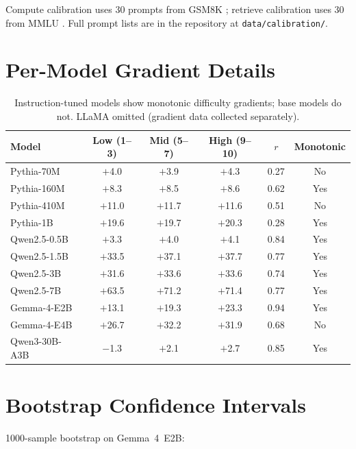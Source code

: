 \documentclass[11pt]{article}
\begin{document}
Compute calibration uses 30 prompts from GSM8K \citep{cobbe2021gsm8k}; retrieve calibration uses 30 from MMLU \citep{hendrycks2021mmlu}. Full prompt lists are in the repository at \texttt{data/calibration/}.

\section{Per-Model Gradient Details}\label{app:gradient}

\begin{table}[h]
\caption{Instruction-tuned models show monotonic difficulty gradients; base models do not. LLaMA omitted (gradient data collected separately).}
\vspace{4pt}
\centering
\small
\begin{tabular}{@{}lccccc@{}}
\toprule
Model & Low (1--3) & Mid (5--7) & High (9--10) & $r$ & Monotonic \\
\midrule
Pythia-70M & $+$4.0 & $+$3.9 & $+$4.3 & 0.27 & No \\
Pythia-160M & $+$8.3 & $+$8.5 & $+$8.6 & 0.62 & Yes \\
Pythia-410M & $+$11.0 & $+$11.7 & $+$11.6 & 0.51 & No \\
Pythia-1B & $+$19.6 & $+$19.7 & $+$20.3 & 0.28 & Yes \\
\midrule
Qwen2.5-0.5B & $+$3.3 & $+$4.0 & $+$4.1 & 0.84 & Yes \\
Qwen2.5-1.5B & $+$33.5 & $+$37.1 & $+$37.7 & 0.77 & Yes \\
Qwen2.5-3B & $+$31.6 & $+$33.6 & $+$33.6 & 0.74 & Yes \\
Qwen2.5-7B & $+$63.5 & $+$71.2 & $+$71.4 & 0.77 & Yes \\
\midrule
Gemma-4-E2B & $+$13.1 & $+$19.3 & $+$23.3 & 0.94 & Yes \\
Gemma-4-E4B & $+$26.7 & $+$32.2 & $+$31.9 & 0.68 & No \\
\midrule
Qwen3-30B-A3B & $-$1.3 & $+$2.1 & $+$2.7 & 0.85 & Yes \\
\bottomrule
\end{tabular}
\end{table}

\section{Bootstrap Confidence Intervals}\label{app:bootstrap}

1000-sample bootstrap on Gemma~4~E2B:
\end{document}
